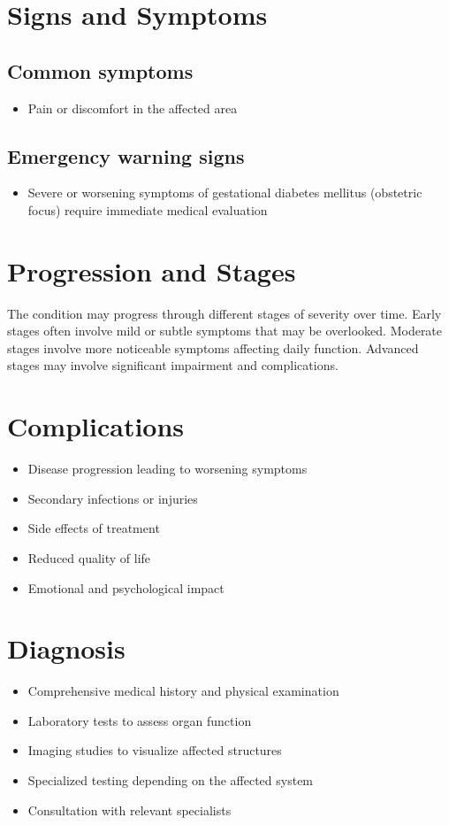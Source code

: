 \section{Signs and Symptoms}
\subsection{Common symptoms}
\begin{itemize}[noitemsep]
  \item Pain or discomfort in the affected area
  \end{itemize}
\subsection{Emergency warning signs}
\begin{itemize}[noitemsep]
  \item Severe or worsening symptoms of gestational diabetes mellitus (obstetric focus) require immediate medical evaluation
\end{itemize}
\section{Progression and Stages}
The condition may progress through different stages of severity over time. Early stages often involve mild or subtle symptoms that may be overlooked. Moderate stages involve more noticeable symptoms affecting daily function. Advanced stages may involve significant impairment and complications.
\section{Complications}
\begin{itemize}[noitemsep]
  \item Disease progression leading to worsening symptoms
  \item Secondary infections or injuries
  \item Side effects of treatment
  \item Reduced quality of life
  \item Emotional and psychological impact
\end{itemize}
\section{Diagnosis}
\begin{itemize}[noitemsep]
  \item Comprehensive medical history and physical examination
  \item Laboratory tests to assess organ function
  \item Imaging studies to visualize affected structures
  \item Specialized testing depending on the affected system
  \item Consultation with relevant specialists
\end{itemize}
